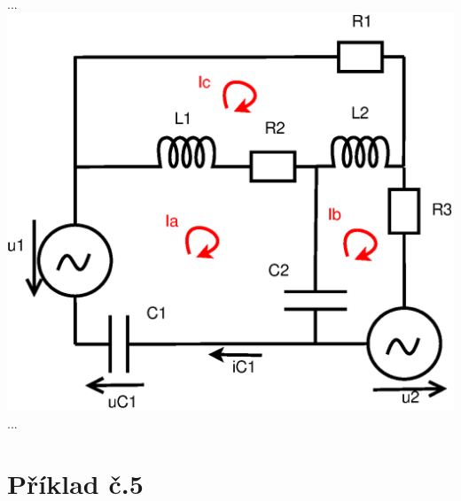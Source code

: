 \documentclass[a4paper, 12pt]{article}
\begin{document}
\\
 ...
\includegraphics[scale=0.5]{pr4/dd_2.eps}
 ...
 \newpage
\section{Příklad č.5}
\end{document}
